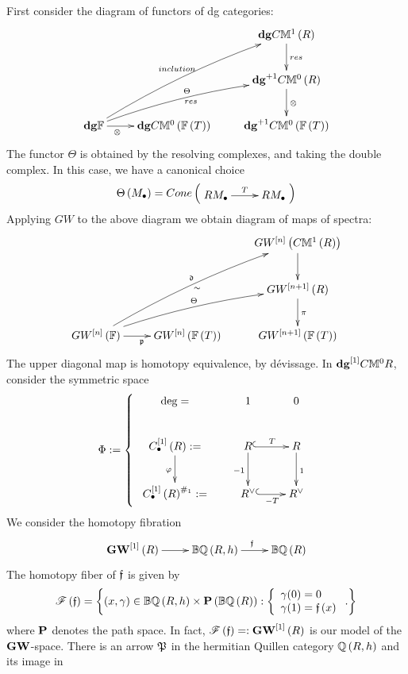\documentclass[12pt]{article}
\begin{document}
First consider the diagram of functors of dg categories: 
$$
\diagram 
&& {\bf dg}C{\BM}^1\LRf{R}\ar[d]^{res}\\
&&  {\bf dg}^{+1}C{\BM}^0\LRf{R}\ar[d]^{\otimes}\\
{\bf dg}{\BF} \ar[r]_{\otimes\qquad \quad}\ar@/^/[urr]^{\Theta}_{res}\ar@/^/[rruu]^{inclution}&{\bf dg}C{\BM}^0\LRf{{\BF}\LRf{T}}&  {\bf dg}^{+1}C{\BM}^0\LRf{{\BF}\LRf{T}}\\
\enddiagram 
$$
The functor $\Theta$ is obtained by the resolving complexes, and taking the double complex.  
In this case, we have a canonical choice
$$
\Theta\LRf{M_{\bul}}=Cone\LRf{\diagram RM_{\bul} \ar[r]^T & RM_{\bul}\\ \enddiagram}
$$
Applying $GW$ to the above diagram we obtain diagram of maps of spectra:
$$
\diagram 
&&  GW^{\LRt{n}}\LRf{C{\BM}^1\LRf{R}}\ar[d]\\
&&  GW^{\LRt{n+1}}\LRf{R}\ar[d]^{\pi}\\
GW^{\LRt{n}}\LRf{{\BF}}\ar[r]_{\p}\ar@/^/[urr]^{\Theta}\ar@/^/[rruu]^{\d}_{\sim}&
GW^{\LRt{n}}\LRf{{\BF}\LRf{T}}&  GW^{\LRt{n+1}}\LRf{{\BF}\LRf{T}}\\
\enddiagram  
$$
The upper diagonal map is homotopy equivalence, by d\'{e}vissage. 
In $ {\bf dg}^{\LRt{1}}C{\BM}^0R$, consider the  symmetric space 
$$
\Phi:=
\LBrace{{l}
\diagram
\deg= &1&0\\
{C}^{\LRt{1}}_{\bul}\LRf{{R}}:=\ar[d]_{\varphi}& R \ar@{^(->}[r]^T\ar[d]_{-1}& R\ar[d]^{1}\\
{C}^{\LRt{1}}_{\bul}\LRf{{R}}^{\#_1}:=& R^{\vee} \ar@{^(->}[r]_{-T}& R^{\vee}\\
 \enddiagram  %
 }
 $$
 We consider the homotopy fibration \cite[pp 424]{M23}
 $$
 \diagram 
 {\bf GW}^{\LRt{1}}\LRf{R} \ar[r] & {\BB}{\BQ}\LRf{{R}, h} \ar[r]^{\f} & {\BB}{\BQ}\LRf{{R}} \\
 \enddiagram 
 $$
 The homotopy fiber of $\f$ is given by \cite[pp 600]{M23}
 $$
 {\SF}\LRf{\f} =\LRs{
 \LRf{x, \gamma}\in {\BB}{\BQ}\LRf{R, h}  \times {\bfP}\LRf{{\BB}{\BQ}\LRf{R}}: 
 \LBrace{{l}
 \gamma(0)=0\\
  \gamma(1)=\f\LRf{x}\\
  }.
 }
 $$
 where ${\bfP}$ denotes the path space. 
 In fact, ${\SF}\LRf{\f}=:{\bf GW}^{\LRt{1}}\LRf{R}$ is our model of the ${\bf GW}$-space. 
%
 There is an arrow $\P$ in the hermitian Quillen category ${\BQ}\LRf{R, h}$ and its image in
\end{document}
